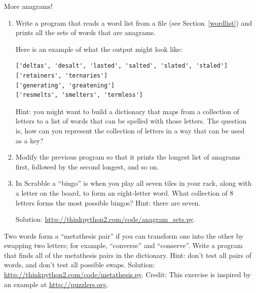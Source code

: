 \documentclass[10pt]{book}
\begin{document}
\begin{exercise}
\label{anagrams}

More anagrams!

\begin{enumerate}

\item Write a program
that reads a word list from a file (see Section~\ref{wordlist}) and
prints all the sets of words that are anagrams.

Here is an example of what the output might look like:

\begin{verbatim}
['deltas', 'desalt', 'lasted', 'salted', 'slated', 'staled']
['retainers', 'ternaries']
['generating', 'greatening']
['resmelts', 'smelters', 'termless']
\end{verbatim}
%
Hint: you might want to build a dictionary that maps from a
collection of letters to a list of words that can be spelled with those
letters.  The question is, how can you represent the collection of
letters in a way that can be used as a key?

\item Modify the previous program so that it prints the longest list
of anagrams first, followed by the second longest, and so on.

\item In Scrabble a ``bingo'' is when you play all seven tiles in
your rack, along with a letter on the board, to form an eight-letter
word.  What collection of 8 letters forms the most possible bingos?
Hint: there are seven.


Solution: \url{http://thinkpython2.com/code/anagram_sets.py}.

\end{enumerate}
\end{exercise}

\begin{exercise}

Two words form a ``metathesis pair'' if you can transform one into the
other by swapping two letters; for example, ``converse'' and
``conserve''.  Write a program that finds all of the metathesis pairs
in the dictionary.  Hint: don't test all pairs of words, and don't
test all possible swaps.  Solution:
\url{http://thinkpython2.com/code/metathesis.py}.  Credit: This
exercise is inspired by an example at \url{http://puzzlers.org}.

\end{exercise}
\end{document}
